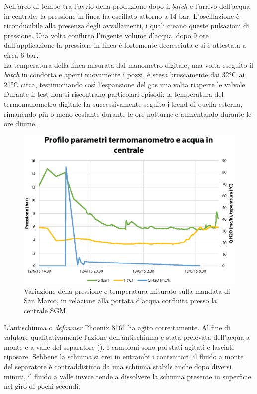 Nell'arco di tempo tra l'avvio della produzione dopo il \textit{batch} e l'arrivo dell'acqua in centrale, la pressione in linea ha oscillato attorno a 14 bar. L'oscillazione è riconducibile alla presenza degli avvallamenti, i quali creano queste pulsazioni di pressione. Una volta confluito l'ingente volume d'acqua, dopo 9 ore dall'applicazione la pressione in linea è fortemente decresciuta e si è attestata a circa 6 bar. \\
La temperatura della linea misurata dal manometro digitale, una volta eseguito il \textit{batch} in condotta e aperti nuovamente i pozzi, è scesa bruscamente dai 32°C ai 21°C circa, testimoniando così l'espansione del gas una volta riaperte le valvole. Durante il test non si riscontrano particolari episodi: la temperatura del termomanometro digitale ha successivamente seguito i trend di quella esterna, rimanendo più o meno costante durante le ore notturne e aumentando durante le ore diurne.\\
\begin{figure}[htbp]
    \centering
    \includegraphics[width=\textwidth]{fig/test/graphs/profili.eps}
    \caption{Variazione della pressione e temperatura misurato sulla mandata di San Marco, in relazione alla portata d'acqua confluita presso la centrale SGM} 
    \label{fig:test-profili}
\end{figure}
L’antischiuma o \textit{defoamer} Phoenix 8161 ha agito correttamente. Al fine di valutare qualitativamente l’azione dell'antischiuma è stata prelevata dell'acqua a monte e a valle del separatore (). I campioni sono poi stati agitati e lasciati riposare. Sebbene la schiuma si crei in entrambi i contenitori, il fluido a monte del separatore è contraddistinto da una schiuma stabile anche dopo diversi minuti, il fluido a valle invece tende a dissolvere la schiuma presente in superficie nel giro di pochi secondi.
